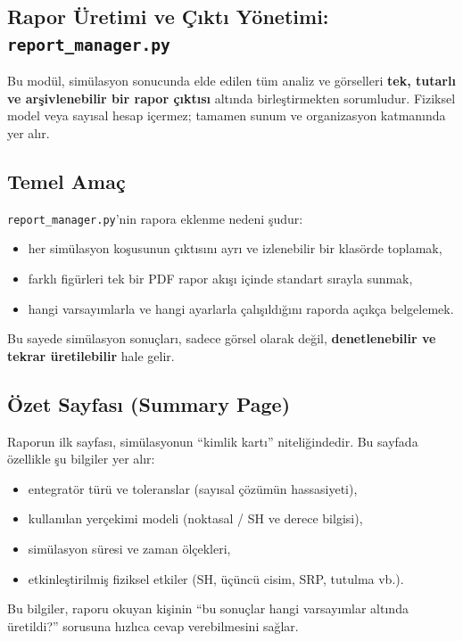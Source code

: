 \newpage
\subsection{Rapor Üretimi ve Çıktı Yönetimi: \texttt{report\_manager.py}}
\label{subsec:report_manager}

Bu modül, simülasyon sonucunda elde edilen tüm analiz ve görselleri \textbf{tek, tutarlı ve arşivlenebilir bir rapor çıktısı} altında birleştirmekten sorumludur. Fiziksel model veya sayısal hesap içermez; tamamen sunum ve organizasyon katmanında yer alır.

\subsection*{Temel Amaç}
\texttt{report\_manager.py}’nin rapora eklenme nedeni şudur:
\begin{itemize}
  \item her simülasyon koşusunun çıktısını ayrı ve izlenebilir bir klasörde toplamak,
  \item farklı figürleri tek bir PDF rapor akışı içinde standart sırayla sunmak,
  \item hangi varsayımlarla ve hangi ayarlarla çalışıldığını raporda açıkça belgelemek.
\end{itemize}

Bu sayede simülasyon sonuçları,
sadece görsel olarak değil,
\textbf{denetlenebilir ve tekrar üretilebilir} hale gelir.

\subsection*{Özet Sayfası (Summary Page)}
Raporun ilk sayfası,
simülasyonun “kimlik kartı” niteliğindedir.
Bu sayfada özellikle şu bilgiler yer alır:
\begin{itemize}
  \item entegratör türü ve toleranslar (sayısal çözümün hassasiyeti),
  \item kullanılan yerçekimi modeli (noktasal / SH ve derece bilgisi),
  \item simülasyon süresi ve zaman ölçekleri,
  \item etkinleştirilmiş fiziksel etkiler (SH, üçüncü cisim, SRP, tutulma vb.).
\end{itemize}

Bu bilgiler, raporu okuyan kişinin
“bu sonuçlar hangi varsayımlar altında üretildi?”
sorusuna hızlıca cevap verebilmesini sağlar.

